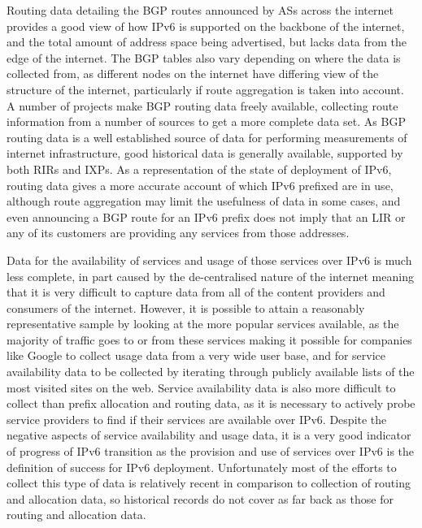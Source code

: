 Routing data detailing the BGP routes announced by ASs across the internet
provides a good view of how IPv6 is supported on the backbone of the internet,
and the total amount of address space being advertised, but lacks data from the
edge of the internet. The BGP tables also vary depending on where the data is
collected from, as different nodes on the internet have differing view of the
structure of the internet, particularly if route aggregation is taken into
account. A number of projects make BGP routing data freely available, collecting
route information from a number of sources to get a more complete data set. As
BGP routing data is a well established source of data for performing
measurements of internet infrastructure, good historical data is generally
available, supported by both RIRs and IXPs. As a representation of the state of
deployment of IPv6, routing data gives a more accurate account of which IPv6
prefixed are in use, although route aggregation may limit the usefulness of data
in some cases, and even announcing a BGP route for an IPv6 prefix does not
imply that an LIR or any of its customers are providing any services from those
addresses.

Data for the availability of services and usage of those services over IPv6 is
much less complete, in part caused by the de-centralised nature of the internet
meaning that it is very difficult to capture data from all of the content
providers and consumers of the internet. However, it is possible to attain a
reasonably representative sample by looking at the more popular services
available, as the majority of traffic goes to or from these services making it
possible for companies like Google to collect usage data from a very wide user
base, and for service availability data to be collected by iterating through
publicly available lists of the most visited sites on the web. Service
availability data is also more difficult to collect than prefix allocation and
routing data, as it is necessary to actively probe service providers to find if
their services are available over IPv6. Despite the negative aspects of service
availability and usage data, it is a very good indicator of progress of IPv6
transition as the provision and use of services over IPv6 is the definition of
success for IPv6 deployment. Unfortunately most of the efforts to collect this
type of data is relatively recent in comparison to collection of routing and
allocation data, so historical records do not cover as far back as those for
routing and allocation data.

